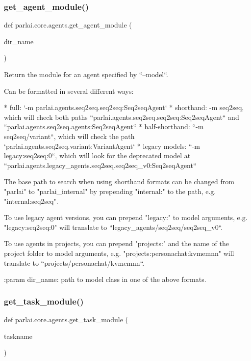 \subsubsection{\texorpdfstring{get\+\_\+agent\+\_\+module()}{get\_agent\_module()}}
{\footnotesize\ttfamily def parlai.\+core.\+agents.\+get\+\_\+agent\+\_\+module (\begin{DoxyParamCaption}\item[{}]{dir\+\_\+name }\end{DoxyParamCaption})}

\begin{DoxyVerb}Return the module for an agent specified by ``--model``.

Can be formatted in several different ways:

* full: `-m parlai.agents.seq2seq.seq2seq:Seq2seqAgent`
* shorthand: -m seq2seq, which will check both paths
  ``parlai.agents.seq2seq.seq2seq:Seq2seqAgent`` and
  ``parlai.agents.seq2seq.agents:Seq2seqAgent``
* half-shorthand: ``-m seq2seq/variant``, which will check the path
  `parlai.agents.seq2seq.variant:VariantAgent`
* legacy models: ``-m legacy:seq2seq:0``, which will look for the deprecated
  model at ``parlai.agents.legacy_agents.seq2seq.seq2seq_v0:Seq2seqAgent``

The base path to search when using shorthand formats can be changed from
"parlai" to "parlai_internal" by prepending "internal:" to the path, e.g.
"internal:seq2seq".

To use legacy agent versions, you can prepend "legacy:" to model arguments,
e.g. "legacy:seq2seq:0" will translate to ``legacy_agents/seq2seq/seq2seq_v0``.

To use agents in projects, you can prepend "projects:" and the name of the
project folder to model arguments, e.g. "projects:personachat:kvmemnn"
will translate to ``projects/personachat/kvmemnn``.

:param dir_name: path to model class in one of the above formats.
\end{DoxyVerb}
 \mbox{\label{namespaceparlai_1_1core_1_1agents_a530b987b67a802a8e9c5fa3c24ae942f}} 
\subsubsection{\texorpdfstring{get\+\_\+task\+\_\+module()}{get\_task\_module()}}
{\footnotesize\ttfamily def parlai.\+core.\+agents.\+get\+\_\+task\+\_\+module (\begin{DoxyParamCaption}\item[{}]{taskname }\end{DoxyParamCaption})}

